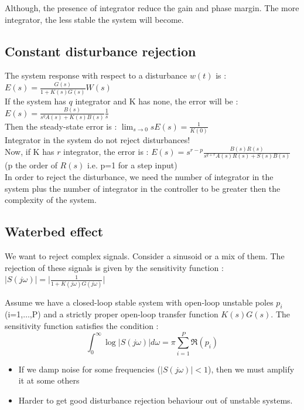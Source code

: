 \documentclass[../main.tex]{subfiles}
\begin{document}
Although, the presence of integrator reduce the gain and phase margin. The more integrator, the less stable the system will become.\\

\subsection{Constant disturbance rejection}
The system response with respect to a disturbance $w(t)$ is : $E(s) = \frac{G(s)}{1+K(s)G(s)} W(s)$\\

If the system has $q$ integrator and K has none, the error will be : $E(s) = \frac{B(s)}{s^q A(s) + K(s) B(s)} \frac{1}{s}$\\
Then the steady-state error is : $\lim_{s\rightarrow 0} sE(s) = \frac{1}{K(0)}$\\
Integrator in the system do not reject disturbances!\\


Now, if K has $r$ integrator, the error is : $E(s) = s^{r-p} \frac{B(s)R(s)}{s^{q+r}A(s) R(s) + S(s)B(s)}$ (p the order of $R(s)$ i.e. p=1 for a step input)\\
In order to reject the disturbance, we need the number of integrator in the system plus the number of integrator in the controller to be greater then the complexity of the system.\\

\subsection{Waterbed effect}
We want to reject complex signals. Consider a sinusoid or a mix of them. The rejection of these signals is given by the sensitivity function : $\lvert S(j\omega)\rvert = \lvert \frac{1}{1+K(j\omega) G(j\omega)}\rvert$\\

\begin{theorem}
    Assume we have a closed-loop stable system with open-loop unstable poles $p_i$ (i=1,$\dots$,P) and a strictly proper open-loop transfer function $K(s)G(s)$. The sensitivity function satisfies the condition : \begin{equation}
        \int_0^\infty \log \lvert S(j\omega)\rvert d\omega = \pi \sum_{i=1}^P \Re(p_i)
    \end{equation}
\end{theorem}

\begin{itemize}
    \item If we damp noise for some frequencies ($\lvert S(j\omega) \rvert < 1$), then we must amplify it at some others\\
    \item Harder to get good disturbance rejection behaviour out of unstable systems.\\
\end{itemize}
\end{document}

